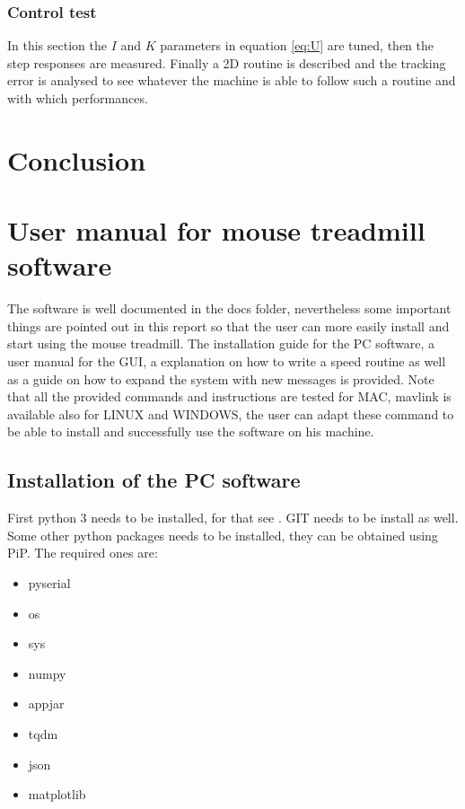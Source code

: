 \documentclass[12pt,a4paper, twoside]{article}
\begin{document}
\subsubsection{Control test}\label{sec:control_test}
In this section the $I$ and $K$ parameters in equation \ref{eq:U} are tuned, then the step responses are measured. Finally a 2D routine is described and the tracking error is analysed to see whatever the machine is able to follow such a routine and with which performances.








\section{Conclusion} \label{sec:conc}

\newpage
\section[User manual]{User manual for mouse treadmill software}\label{sec:user_manual}
The software is well documented in the docs folder, nevertheless some important things are pointed out in this report so that the user can more easily install and start using the mouse treadmill. The installation guide for the PC software, a user manual for the GUI, a explanation on how to write a speed routine as well as a guide on how to expand the system with new messages is provided. Note that all the provided commands and instructions are tested for MAC, mavlink is available also for LINUX and WINDOWS, the user can adapt these command to be able to install and successfully use the software on his machine. 
\subsection{Installation of the PC software}\label{sec:install}
First python 3 needs to be installed, for that see \cite{py}. GIT needs to be install as well. Some other python packages needs to be installed, they can be obtained using PiP. The required ones are:\\
\begin{multicols}{3}[]
	\begin{itemize}
		\item pyserial
		\item os
		\item sys
		\item numpy
		\item appjar
		\item tqdm
		\item json
		\item matplotlib
	\end{itemize}
\end{multicols}
\end{document}
